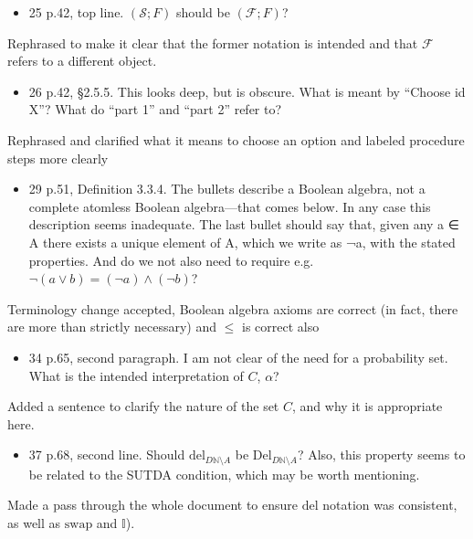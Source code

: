 \documentclass[12pt, a4paper]{article}
\begin{document}
\begin{itemize}
    \item 25 p.42, top line. $(\mathcal{S}; F)$ should be $(\mathcal{F}; F)$?
\end{itemize}

Rephrased to make it clear that the former notation is intended and that $\mathcal{F}$ refers to a different object.

\begin{itemize}
    \item 26 p.42, §2.5.5. This looks deep, but is obscure. What is meant by ``Choose id X''? What do ``part 1'' and ``part 2'' refer to?
\end{itemize}

Rephrased and clarified what it means to choose an option and labeled procedure steps more clearly

\begin{itemize}
    \item 29 p.51, Definition 3.3.4. The bullets describe a Boolean algebra, not a complete atomless Boolean algebra—that comes below. In any case this description seems inadequate. The last bullet should say that, given any a ∈ A there exists a unique element of A, which we write as ¬a, with the stated properties. And do we not also need to require e.g. $\lnot (a \lor b) = (\lnot a) \land (\lnot b)$?
\end{itemize}

Terminology change accepted, Boolean algebra axioms are correct (in fact, there are more than strictly necessary) and $\leq$ is correct also

\begin{itemize}
    \item 34 p.65, second paragraph. I am not clear of the need for a probability set. What is the intended interpretation of $C$, $\alpha$?
\end{itemize}

Added a sentence to clarify the nature of the set $C$, and why it is appropriate here.

\begin{itemize}
    \item 37 p.68, second line. Should $\mathrm{del}_{D \mathbb{N}\setminus A}$ be $\mathrm{Del}_{D \mathbb{N}\setminus A}$? Also, this property seems to be related to the SUTDA condition, which may be worth mentioning.
\end{itemize}

Made a pass through the whole document to ensure $\mathrm{del}$ notation was consistent, as well as $\mathrm{swap}$ and $\mathbb{I}$). 
\end{document}
